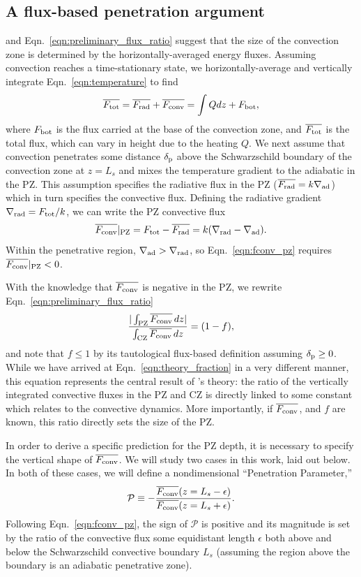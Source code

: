 \documentclass{aastex631}
\newcommand{\gradrad}{\ensuremath{\nabla_{\rm{rad}}}}
\newcommand{\gradad}{\ensuremath{\nabla_{\rm{ad}}}}
\newcommand{\delp}{\ensuremath{\delta_{\rm{p}}}}
\newcommand{\Fbot}{\ensuremath{F_{\rm{bot}}}}
\newcommand{\Ftot}{\ensuremath{F_{\rm{tot}}}}
\newcommand{\Frad}{\ensuremath{F_{\rm{rad}}}}
\newcommand{\Fconv}{\ensuremath{F_{\rm{conv}}}}
\newcommand{\mP}{\ensuremath{\mathcal{P}}}
\renewcommand{\bar}[1]{\overline{#1}}
\begin{document}
\subsection{A flux-based penetration argument}
\citet{zahn1991} and Eqn.~\ref{eqn:preliminary_flux_ratio} suggest that the size of the convection zone is determined by the horizontally-averaged energy fluxes.
Assuming convection reaches a time-stationary state, we horizontally-average and vertically integrate Eqn.~\ref{eqn:temperature} to find
\begin{equation}
\overline{\Ftot} = \overline{\Frad} + \overline{\Fconv} = \int Q dz + \Fbot,
\end{equation}
where $\Fbot$ is the flux carried at the base of the convection zone, and $\overline{\Ftot}$ is the total flux, which can vary in height due to the heating $Q$.
We next assume that convection penetrates some distance $\delp$ above the Schwarzschild boundary of the convection zone at $z = L_s$ and mixes the temperature gradient to the adiabatic in the PZ.
This assumption specifies the radiative flux in the PZ ($\bar{\Frad} = k\gradad$) which in turn specifies the convective flux.
Defining the radiative gradient $\gradrad = \Ftot/k$, we can write the PZ convective flux
\begin{equation}
\overline{\Fconv}|_{\rm{PZ}} = \Ftot - \overline{\Frad} = k(\gradrad - \gradad).
\label{eqn:fconv_pz}
\end{equation}
Within the penetrative region, $\gradad > \gradrad$, so Eqn.~\ref{eqn:fconv_pz} requires $\overline{\Fconv}|_{\rm{PZ}} < 0$.

With the knowledge that $\bar{\Fconv}$ is negative in the PZ, we rewrite Eqn.~\ref{eqn:preliminary_flux_ratio}
\begin{equation}
\frac{|\int_{\rm{PZ}}\bar{\Fconv}\,dz|}{\int_{\rm{CZ}}\bar{\Fconv}\,dz} = (1 - f),
\label{eqn:theory_fraction}
\end{equation}
and note that $f \leq 1$ by its tautological flux-based definition assuming $\delp \geq 0$.
While we have arrived at Eqn.~\ref{eqn:theory_fraction} in a very different manner, this equation represents the central result of \citet{zahn1991}'s theory: the ratio of the vertically integrated convective fluxes in the PZ and CZ is directly linked to some constant which relates to the convective dynamics.
More importantly, if $\bar{\Fconv}$, and $f$ are known, this ratio directly sets the size of the PZ.

In order to derive a specific prediction for the PZ depth, it is necessary to specify the vertical shape of $\overline{\Fconv}$.
We will study two cases in this work, laid out below.
In both of these cases, we will define a nondimensional ``Penetration Parameter,''
\begin{equation}
\mP \equiv -\frac{\overline{\Fconv}(z = L_s - \epsilon)}{\overline{\Fconv}(z = L_s + \epsilon)}.
\label{eqn:theory_P_defn}
\end{equation}
Following Eqn.~\ref{eqn:fconv_pz}, the sign of $\mP$ is positive and its magnitude is set by the ratio of the convective flux some equidistant length $\epsilon$ both above and below the Schwarzschild convective boundary $L_s$ (assuming the region above the boundary is an adiabatic penetrative zone).
\end{document}
